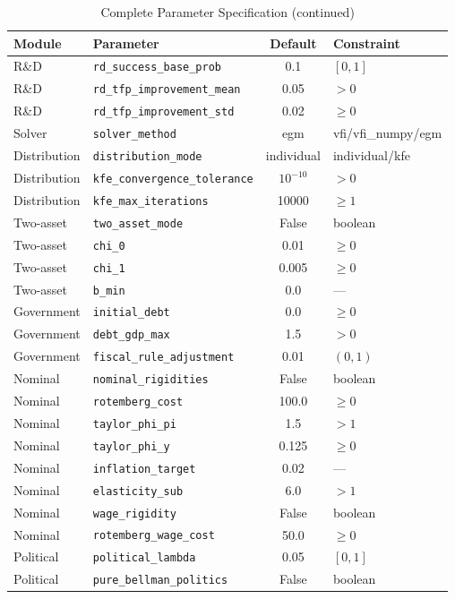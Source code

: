 \documentclass[12pt]{article}
\begin{document}
\begin{table}[tp]
\centering
\caption{Complete Parameter Specification (continued)}\label{tab:full_params2}
\small
\begin{tabular}{@{}llcl@{}}
\toprule
\textbf{Module} & \textbf{Parameter} & \textbf{Default} & \textbf{Constraint} \\
\midrule
R\&D & \texttt{rd\_success\_base\_prob} & 0.1 & $[0, 1]$ \\
R\&D & \texttt{rd\_tfp\_improvement\_mean} & 0.05 & $> 0$ \\
R\&D & \texttt{rd\_tfp\_improvement\_std} & 0.02 & $\geq 0$ \\
\midrule
Solver & \texttt{solver\_method} & egm & vfi/vfi\_numpy/egm \\
Distribution & \texttt{distribution\_mode} & individual & individual/kfe \\
Distribution & \texttt{kfe\_convergence\_tolerance} & $10^{-10}$ & $> 0$ \\
Distribution & \texttt{kfe\_max\_iterations} & 10000 & $\geq 1$ \\
\midrule
Two-asset & \texttt{two\_asset\_mode} & False & boolean \\
Two-asset & \texttt{chi\_0} & 0.01 & $\geq 0$ \\
Two-asset & \texttt{chi\_1} & 0.005 & $\geq 0$ \\
Two-asset & \texttt{b\_min} & 0.0 & --- \\
\midrule
Government & \texttt{initial\_debt} & 0.0 & $\geq 0$ \\
Government & \texttt{debt\_gdp\_max} & 1.5 & $> 0$ \\
Government & \texttt{fiscal\_rule\_adjustment} & 0.01 & $(0, 1)$ \\
\midrule
Nominal & \texttt{nominal\_rigidities} & False & boolean \\
Nominal & \texttt{rotemberg\_cost} & 100.0 & $\geq 0$ \\
Nominal & \texttt{taylor\_phi\_pi} & 1.5 & $> 1$ \\
Nominal & \texttt{taylor\_phi\_y} & 0.125 & $\geq 0$ \\
Nominal & \texttt{inflation\_target} & 0.02 & --- \\
Nominal & \texttt{elasticity\_sub} & 6.0 & $> 1$ \\
Nominal & \texttt{wage\_rigidity} & False & boolean \\
Nominal & \texttt{rotemberg\_wage\_cost} & 50.0 & $\geq 0$ \\
\midrule
Political & \texttt{political\_lambda} & 0.05 & $[0, 1]$ \\
Political & \texttt{pure\_bellman\_politics} & False & boolean \\
\bottomrule
\end{tabular}
\end{table}
\end{document}
